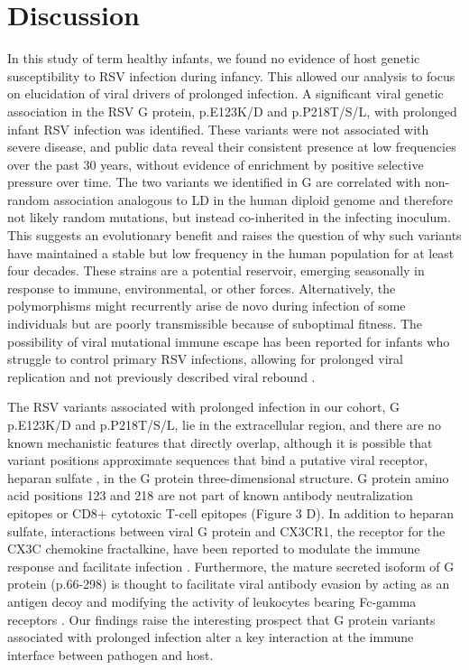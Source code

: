 \documentclass{article} %
\begin{document}
\section{Discussion}
In this study of term healthy infants, we found no evidence of host genetic susceptibility to RSV infection during infancy. This allowed our analysis to focus on elucidation of viral drivers of prolonged infection. A significant viral genetic association in the RSV G protein, p.E123K/D and p.P218T/S/L, with prolonged infant RSV infection was identified. These variants were not associated with severe disease, and public data reveal their consistent presence at low frequencies over the past 30 years, without evidence of enrichment by positive selective pressure over time. The two variants we identified in G are correlated with non-random association analogous to LD in the human diploid genome and therefore not likely random mutations, but instead co-inherited in the infecting inoculum. This suggests an evolutionary benefit and raises the question of why such variants have maintained a stable but low frequency in the human population for at least four decades. These strains are a potential reservoir, emerging seasonally in response to immune, environmental, or other forces. Alternatively, the polymorphisms might recurrently arise de novo during infection of some individuals but are poorly transmissible because of suboptimal fitness. The possibility of viral mutational immune escape has been reported for infants who struggle to control primary RSV infections, allowing for prolonged viral replication and not previously described viral rebound
\citep{brint2017prolonged}.

The RSV variants associated with prolonged infection in our cohort, G p.E123K/D and p.P218T/S/L, lie in the extracellular region, and there are no known mechanistic features that directly overlap, although it is possible that variant positions approximate sequences that bind a putative viral receptor, heparan sulfate
\citep{feldman1999identification}, in the G protein three-dimensional structure. G protein amino acid positions 123 and 218 are not part of known antibody neutralization epitopes or CD8+ cytotoxic T-cell epitopes (Figure 3 D). 
In addition to heparan sulfate, interactions between viral G protein and CX3CR1, the receptor for the CX3C chemokine fractalkine, have been reported to modulate the immune response and facilitate infection 
\citep{levine1987demonstration, feldman1999identification, feldman2000fusion, johnson2015respiratory, tripp2001cx3c, jeong2015cx3cr1}.
Furthermore, the mature secreted isoform of G protein (p.66-298) is thought to facilitate viral antibody evasion by acting as an antigen decoy and modifying the activity of leukocytes bearing Fc-gamma receptors 
\citep{bukreyev2008secreted}. 
Our findings raise the interesting prospect that G protein variants associated with prolonged infection alter a key interaction at the immune interface between pathogen and host. 
\end{document}
